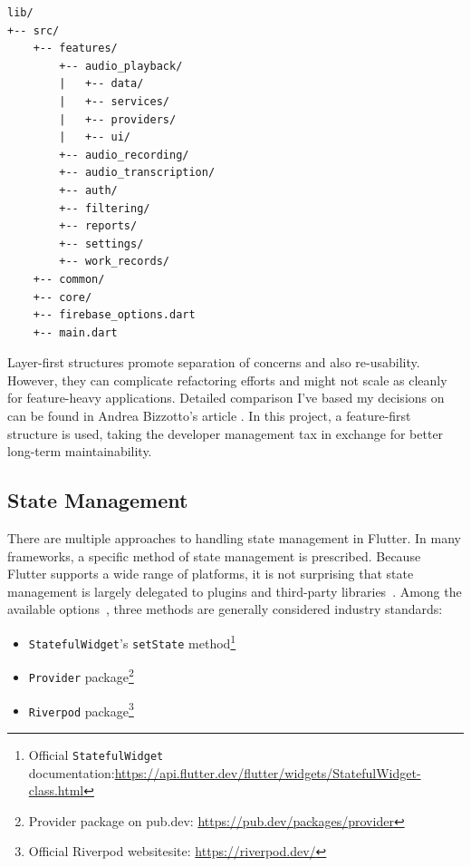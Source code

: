 \documentclass[
  digital,     %
  oneside,     %
  nosansbold,  %
  nocolorbold, %
  lof,         %
  lot,         %
]{fithesis4}
\begin{document}
\begin{listing}[H]
\begin{lstlisting}[caption={Voice Work Record App directory structure}, label={lst:project_directory_timesheet}, floatplacement=H, showstringspaces=false]
lib/
+-- src/
    +-- features/
        +-- audio_playback/
        |   +-- data/
        |   +-- services/
        |   +-- providers/
        |   +-- ui/
        +-- audio_recording/
        +-- audio_transcription/
        +-- auth/
        +-- filtering/
        +-- reports/
        +-- settings/
        +-- work_records/
    +-- common/
    +-- core/
    +-- firebase_options.dart
    +-- main.dart
\end{lstlisting}
\end{listing}

Layer-first structures promote separation of concerns and also re-usability. However, they can complicate refactoring efforts and might not scale as cleanly for feature-heavy applications. Detailed comparison I've based my decisions on can be found in Andrea Bizzotto's article \cite{flutterStructure}. In this project, a feature-first structure is used, taking the developer management tax in exchange for better long-term maintainability.

\subsection{State Management}
There are multiple approaches to handling state management in Flutter. In many frameworks, a specific method of state management is prescribed. Because Flutter supports a wide range of platforms, it is not surprising that state management is largely delegated to plugins and third-party libraries~\cite{flutterStateMgmt}. Among the available options~\cite{flutterStateMgmt}, three methods are generally considered industry standards:

\begin{itemize}
  \item \texttt{StatefulWidget}'s \texttt{setState} method\footnote{Official \texttt{StatefulWidget} documentation:\newline\url{https://api.flutter.dev/flutter/widgets/StatefulWidget-class.html}}
  \item \texttt{Provider} package\footnote{Provider package on pub.dev: \url{https://pub.dev/packages/provider}}
  \item \texttt{Riverpod} package\footnote{Official Riverpod websitesite: \url{https://riverpod.dev/}}
\end{itemize}
\end{document}

